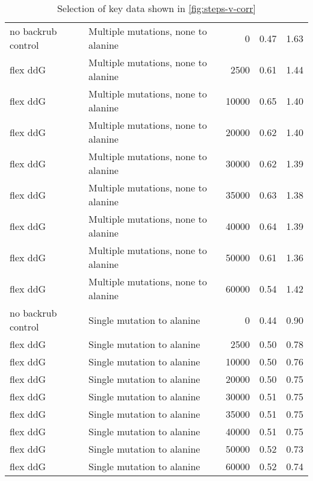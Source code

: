 \begin{table}
\begin{tabular}{llrrr}
 no backrub control &  Multiple mutations, none to alanine &             0 & 0.47 & 1.63 \\
           flex ddG &  Multiple mutations, none to alanine &          2500 & 0.61 & 1.44 \\
           flex ddG &  Multiple mutations, none to alanine &         10000 & 0.65 & 1.40 \\
           flex ddG &  Multiple mutations, none to alanine &         20000 & 0.62 & 1.40 \\
           flex ddG &  Multiple mutations, none to alanine &         30000 & 0.62 & 1.39 \\
           flex ddG &  Multiple mutations, none to alanine &         35000 & 0.63 & 1.38 \\
           flex ddG &  Multiple mutations, none to alanine &         40000 & 0.64 & 1.39 \\
           flex ddG &  Multiple mutations, none to alanine &         50000 & 0.61 & 1.36 \\
           flex ddG &  Multiple mutations, none to alanine &         60000 & 0.54 & 1.42 \\
 no backrub control &           Single mutation to alanine &             0 & 0.44 & 0.90 \\
           flex ddG &           Single mutation to alanine &          2500 & 0.50 & 0.78 \\
           flex ddG &           Single mutation to alanine &         10000 & 0.50 & 0.76 \\
           flex ddG &           Single mutation to alanine &         20000 & 0.50 & 0.75 \\
           flex ddG &           Single mutation to alanine &         30000 & 0.51 & 0.75 \\
           flex ddG &           Single mutation to alanine &         35000 & 0.51 & 0.75 \\
           flex ddG &           Single mutation to alanine &         40000 & 0.51 & 0.75 \\
           flex ddG &           Single mutation to alanine &         50000 & 0.52 & 0.73 \\
           flex ddG &           Single mutation to alanine &         60000 & 0.52 & 0.74 \\
\bottomrule
\end{tabular}

\caption[]{Selection of key data shown in \cref{fig:steps-v-corr}}
\label{tab:steps-v-corr-underlying-data}
\end{table}
